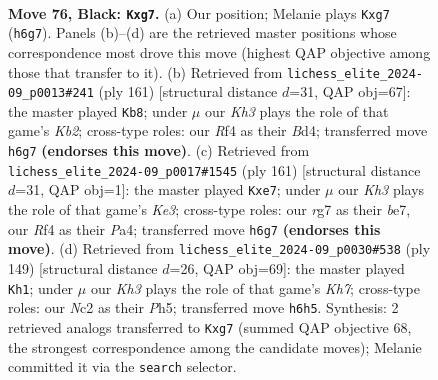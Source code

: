 \documentclass[11pt]{article}
\begin{document}
\clearpage

\begin{figure}[p]\centering
\begin{subfigure}{0.46\textwidth}\centering
\resizebox{\linewidth}{!}{%
\newchessgame
\chessboard[
  setfen={8/6R1/7k/6B1/5r2/7K/2n1bP2/8 b - - 13 76},
  showmover=false,
  pgfstyle=straightmove, color=movearrow, markmove={h6-g7}
]}
\caption{}
\end{subfigure}\hfill
\begin{subfigure}{0.46\textwidth}\centering
\resizebox{\linewidth}{!}{%
\newchessgame
\chessboard[
  setfen={8/1k1K4/B5R1/8/3b4/8/8/8 b - - 23 81},
  showmover=false,
  pgfstyle=straightmove, color=movearrow, markmove={b7-b8}
]}
\caption{}
\end{subfigure}
\\[4pt]
\begin{subfigure}{0.46\textwidth}\centering
\resizebox{\linewidth}{!}{%
\newchessgame
\chessboard[
  setfen={8/4B3/2P1k3/8/p7/K7/2r5/3R4 b - - 0 81},
  showmover=false,
  pgfstyle=straightmove, color=movearrow, markmove={e6-e7}
]}
\caption{}
\end{subfigure}\hfill
\begin{subfigure}{0.46\textwidth}\centering
\resizebox{\linewidth}{!}{%
\newchessgame
\chessboard[
  setfen={8/8/8/7p/5K2/6R1/r6k/6B1 b - - 19 75},
  showmover=false,
  pgfstyle=straightmove, color=movearrow, markmove={h2-h1}
]}
\caption{}
\end{subfigure}
\caption{\textbf{Move 76, Black: \texttt{Kxg7}.} (a) Our position; Melanie plays \texttt{Kxg7} (\texttt{h6g7}). Panels (b)--(d) are the retrieved master positions whose correspondence most drove this move (highest QAP objective among those that transfer to it). (b) Retrieved from \texttt{lichess\_elite\_2024-09\_p0013\#241} (ply 161) [structural distance $d$=31, QAP obj=67]: the master played \texttt{Kb8}; under $\mu$ our \emph{Kh3} plays the role of that game's \emph{Kb2}; cross-type roles: our \emph{R}f4 as their \emph{B}d4; transferred move \texttt{h6g7} \textbf{(endorses this move)}. (c) Retrieved from \texttt{lichess\_elite\_2024-09\_p0017\#1545} (ply 161) [structural distance $d$=31, QAP obj=1]: the master played \texttt{Kxe7}; under $\mu$ our \emph{Kh3} plays the role of that game's \emph{Ke3}; cross-type roles: our \emph{r}g7 as their \emph{b}e7, our \emph{R}f4 as their \emph{P}a4; transferred move \texttt{h6g7} \textbf{(endorses this move)}. (d) Retrieved from \texttt{lichess\_elite\_2024-09\_p0030\#538} (ply 149) [structural distance $d$=26, QAP obj=69]: the master played \texttt{Kh1}; under $\mu$ our \emph{Kh3} plays the role of that game's \emph{Kh7}; cross-type roles: our \emph{N}c2 as their \emph{P}h5; transferred move \texttt{h6h5}. Synthesis: 2 retrieved analogs transferred to \texttt{Kxg7} (summed QAP objective 68, the strongest correspondence among the candidate moves); Melanie committed it via the \texttt{search} selector.}
\label{fig:thought-m151}
\end{figure}
\end{document}
